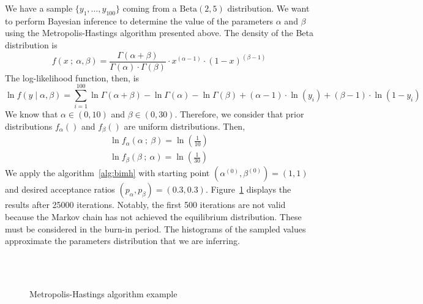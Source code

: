 \documentclass[11pt,fleqn]{book} %
\begin{document}
\begin{example}
	We have a sample $\{y_1,\dots,y_{100}\}$ coming from a $\text{Beta}(2,5)$ 
	distribution. We want to perform Bayesian inference to determine the value 
	of the parameters $\alpha$ and $\beta$ using the Metropolis-Hastings 
	algorithm presented above. The density of the Beta distribution is
	\begin{displaymath}
		f(x\ ;\ \alpha, \beta) = 
		\frac{\Gamma(\alpha+\beta)}{\Gamma(\alpha) \cdot \Gamma(\beta)} 
		\cdot x^{(\alpha-1)} \cdot (1-x)^{(\beta-1)}
	\end{displaymath}
	The log-likelihood function, then, is
	\begin{displaymath}
		\ln f(y \mid \alpha, \beta) = 
		\displaystyle \sum_{i=1}^{100} 
		\ln \Gamma(\alpha+\beta) - \ln \Gamma(\alpha) - \ln \Gamma(\beta) +
		(\alpha-1) \cdot \ln(y_i) + (\beta-1) \cdot \ln(1-y_i)
	\end{displaymath}
	We know that $\alpha \in (0,10)$ and $\beta \in (0,30)$. Therefore, we 
	consider that prior distributions $f_{\alpha}()$ and $f_{\beta}()$ are 
	uniform distributions. Then,
	\begin{displaymath}
		\begin{array}{l}
			\ln f_{\alpha}(\alpha \ ;\ \beta) = \ln(\frac{1}{10})
			\\
			\ln f_{\beta}(\beta \ ;\ \alpha) = \ln(\frac{1}{30})
		\end{array}
	\end{displaymath}
	We apply the algorithm~\ref{alg:bimh} with starting point 
	$\left(\alpha^{(0)},\beta^{(0)}\right)=(1,1)$ and 
	desired acceptance ratios $(p_{\alpha},p_{\beta})=(0.3,0.3)$.
	Figure~\ref{fig:mhbd} displays the results after \num{25000} iterations.
	Notably, the first 500 iterations are not valid because the Markov 
	chain has not achieved the equilibrium distribution. These must be 
	considered in the burn-in period. The histograms of the sampled values
	approximate the parameters distribution that we are inferring.
	\begin{figure}[!ht]
		\centering
		\\
		\\
		\caption{Metropolis-Hastings algorithm example}
		\label{fig:mhbd}
	\end{figure}
\end{example}
\end{document}
